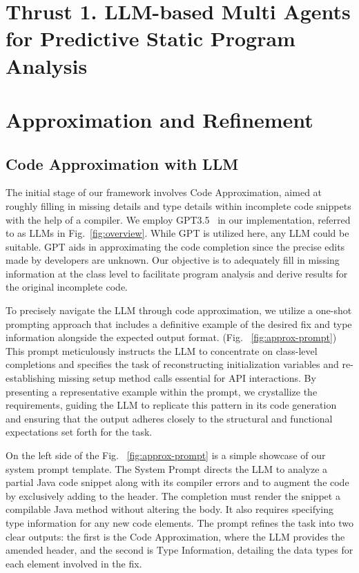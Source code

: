 \section{Thrust 1. LLM-based Multi Agents for Predictive Static Program Analysis}
\label{sec:thrust1}


\section{Approximation and Refinement}

\subsection{Code Approximation with LLM}



% 

The initial stage of our framework involves Code Approximation, aimed at roughly filling in missing details and type details within incomplete code snippets with the help of a compiler. We employ GPT3.5~\cite{ChatGPT} in our implementation, referred to as LLMs in Fig.~\ref{fig:overview}. While GPT is utilized here, any LLM could be suitable. GPT aids in approximating the code completion since the precise edits made by developers are unknown. Our objective is to adequately fill in missing information at the class level to facilitate program analysis and derive results for the original incomplete code.

To precisely navigate the LLM through code approximation, we utilize a one-shot prompting approach that includes a definitive example of the desired fix and type information alongside the expected output format. (Fig. ~\ref{fig:approx-prompt}) This prompt meticulously instructs the LLM to concentrate on class-level completions and specifies the task of reconstructing initialization variables and re-establishing missing setup method calls essential for API interactions. By presenting a representative example within the prompt, we crystallize the requirements, guiding the LLM to replicate this pattern in its code generation and ensuring that the output adheres closely to the structural and functional expectations set forth for the task.

On the left side of the Fig. ~\ref{fig:approx-prompt} is a simple showcase of our system prompt template. The System Prompt directs the LLM to analyze a partial Java code snippet along with its compiler errors and to augment the code by exclusively adding to the header. The completion must render the snippet a compilable Java method without altering the body. It also requires specifying type information for any new code elements. The prompt refines the task into two clear outputs: the first is the Code Approximation, where the LLM provides the amended header, and the second is Type Information, detailing the data types for each element involved in the fix.

